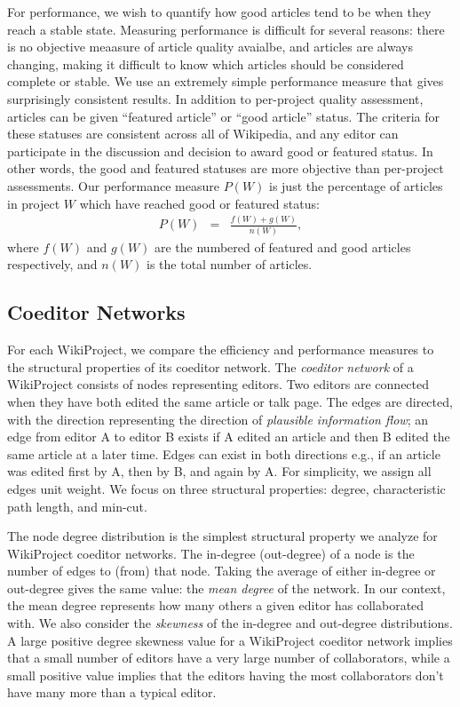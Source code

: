 \documentclass[10pt,twocolumn]{article}
\newcommand{\beq}{\begin{eqnarray}}
\newcommand{\eeq}{\end{eqnarray}}
\newcommand{\+}{\phantom{-}}
\begin{document}
For performance, we wish to quantify how good articles tend to be when they reach a stable state.
Measuring performance is difficult for several reasons:
there is no objective meaasure of article quality avaialbe,
and articles are always changing, making it difficult to know which articles should be considered
complete or stable.
We use an extremely simple performance measure that gives surprisingly consistent results.
In addition to per-project quality assessment, articles can be given ``featured article'' or
``good article'' status.
The criteria for these statuses are consistent across all of Wikipedia,
and any editor can participate in the discussion and decision to award good or featured
status.
In other words, the good and featured statuses are more objective than per-project assessments.
Our performance measure $P(W)$ is just the percentage of articles in project $W$ which have reached
good or featured status:
\beq
P(W) &=& \frac{f(W) + g(W)}{n(W)},
\eeq
where $f(W)$ and $g(W)$ are the numbered of featured and good articles respectively,
and $n(W)$ is the total number of articles.

\subsection{Coeditor Networks}

For each WikiProject, we compare the efficiency and performance measures to the structural
properties of its coeditor network.
The {\em coeditor network} of a WikiProject consists of nodes representing editors.
Two editors are connected when they have both edited the same article or talk page.
The edges are directed, with the direction representing the direction of
{\em plausible information flow};
an edge from editor A to editor B exists if A edited an article and then B edited the same article at
a later time.
Edges can exist in both directions e.g., if an article was edited first by A, then by B, and again by A.
For simplicity, we assign all edges unit weight.
We focus on three structural properties: degree, characteristic path length, and min-cut.

The node degree distribution is the simplest structural property we analyze for WikiProject
coeditor networks.
The in-degree (out-degree) of a node is the number of edges to (from) that node.
Taking the average of either in-degree or out-degree gives the same value:
the {\em mean degree} of the network.
In our context, the mean degree represents how many others a given editor has collaborated with.
We also consider the {\em skewness} of the in-degree and out-degree distributions.
A large positive degree skewness value for a WikiProject coeditor network
implies that a small number of editors have a very large number of collaborators,
while a small positive value implies that the editors having the most collaborators
don't have many more than a typical editor.
\end{document}
